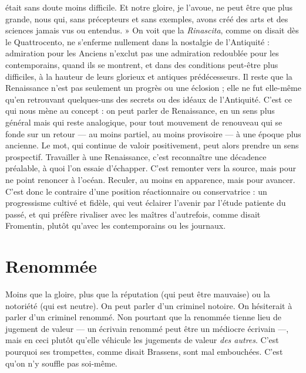 était sans doute moins difficile. Et notre gloire, je l'avoue, ne peut être que
plus grande, nous qui, sans précepteurs et sans exemples, avons créé des arts
et des sciences jamais vus ou entendus. » On voit que la {\it Rinascita}, comme on
disait dès le Quattrocento, ne s’enferme nullement dans la nostalgie de
l'Antiquité : admiration pour les Anciens n'exclut pas une admiration
redoublée pour les contemporains, quand ils se montrent, et dans des conditions
peut-être plus difficiles, à la hauteur de leurs glorieux et antiques prédécesseurs.
Il reste que la Renaissance n’est pas seulement un progrès ou une
éclosion ; elle ne fut elle-même qu’en retrouvant quelques-uns des secrets ou
des idéaux de l’Antiquité. C’est ce qui nous mène au concept : on peut parler
de Renaissance, en un sens plus général mais qui reste analogique, pour tout
mouvement de renouveau qui se fonde sur un retour — au moins partiel, au
moins provisoire — à une époque plus ancienne. Le mot, qui continue de
valoir positivement, peut alors prendre un sens prospectif. Travailler à une
Renaissance, c’est reconnaître une décadence préalable, à quoi l’on essaie
d'échapper. C’est remonter vers la source, mais pour ne point renoncer à
l’océan. Reculer, au moins en apparence, mais pour avancer. C’est donc le
contraire d’une position réactionnaire ou conservatrice : un progressisme
cultivé et fidèle, qui veut éclairer l’avenir par l'étude patiente du passé, et qui
préfère rivaliser avec les maîtres d’autrefois, comme disait Fromentin, plutôt
qu'avec les contemporains ou les journaux.

\section{Renommée}
Moins que la gloire, plus que la réputation (qui peut être
mauvaise) ou la notoriété (qui est neutre). On peut parler
d’un criminel notoire. On hésiterait à parler d’un criminel renommé. Non
pourtant que la renommée tienne lieu de jugement de valeur — un écrivain
renommé peut être un médiocre écrivain —, mais en ceci plutôt qu’elle véhicule
les jugements de valeur {\it des autres}. C’est pourquoi ses trompettes, comme disait
Brassens, sont mal embouchées. C’est qu’on n’y souffle pas soi-même.

